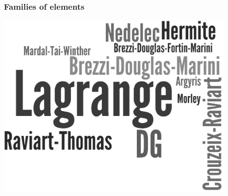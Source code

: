 \begin{frame}
  \frametitle{Families of elements}

  \includegraphics[width=0.9\textwidth]{png/elements_wordle.png}

\end{frame}
